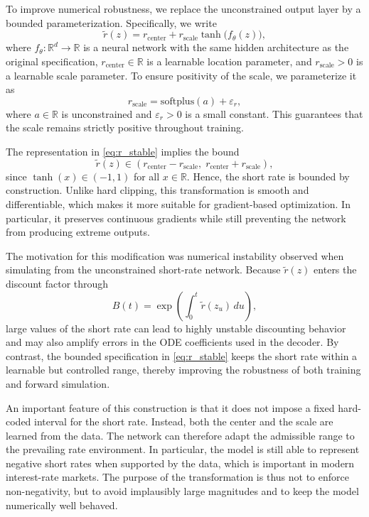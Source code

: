 To improve numerical robustness, we replace the unconstrained output layer by a bounded
parameterization. Specifically, we write
\begin{equation}
\tilde r(z) = r_{\mathrm{center}} + r_{\mathrm{scale}} \tanh\!\bigl(f_\theta(z)\bigr),
\label{eq:r_stable}
\end{equation}
where $f_\theta : \mathbb{R}^d \to \mathbb{R}$ is a neural network with the same hidden
architecture as the original specification, $r_{\mathrm{center}} \in \mathbb{R}$ is a
learnable location parameter, and $r_{\mathrm{scale}} > 0$ is a learnable scale parameter.
To ensure positivity of the scale, we parameterize it as
\begin{equation}
r_{\mathrm{scale}} = \mathrm{softplus}(a) + \varepsilon_r,
\label{eq:r_scale}
\end{equation}
where $a \in \mathbb{R}$ is unconstrained and $\varepsilon_r > 0$ is a small constant.
This guarantees that the scale remains strictly positive throughout training.

The representation in \eqref{eq:r_stable} implies the bound
\begin{equation}
\tilde r(z) \in
\left(
r_{\mathrm{center}} - r_{\mathrm{scale}},
\;
r_{\mathrm{center}} + r_{\mathrm{scale}}
\right),
\end{equation}
since $\tanh(x) \in (-1,1)$ for all $x \in \mathbb{R}$. Hence, the short rate is bounded
by construction. Unlike hard clipping, this transformation is smooth and differentiable,
which makes it more suitable for gradient-based optimization. In particular, it preserves
continuous gradients while still preventing the network from producing extreme outputs.

The motivation for this modification was numerical instability observed when simulating
from the unconstrained short-rate network. Because $\tilde r(z)$ enters the discount
factor through
\begin{equation}
B(t) = \exp\!\left(\int_0^t \tilde r(z_u)\,du\right),
\end{equation}
large values of the short rate can lead to highly unstable discounting behavior and may
also amplify errors in the ODE coefficients used in the decoder. By contrast, the bounded
specification in \eqref{eq:r_stable} keeps the short rate within a learnable but controlled
range, thereby improving the robustness of both training and forward simulation.

An important feature of this construction is that it does not impose a fixed hard-coded
interval for the short rate. Instead, both the center and the scale are learned from the
data. The network can therefore adapt the admissible range to the prevailing rate
environment. In particular, the model is still able to represent negative short rates when
supported by the data, which is important in modern interest-rate markets. The purpose of
the transformation is thus not to enforce non-negativity, but to avoid implausibly large
magnitudes and to keep the model numerically well behaved.


